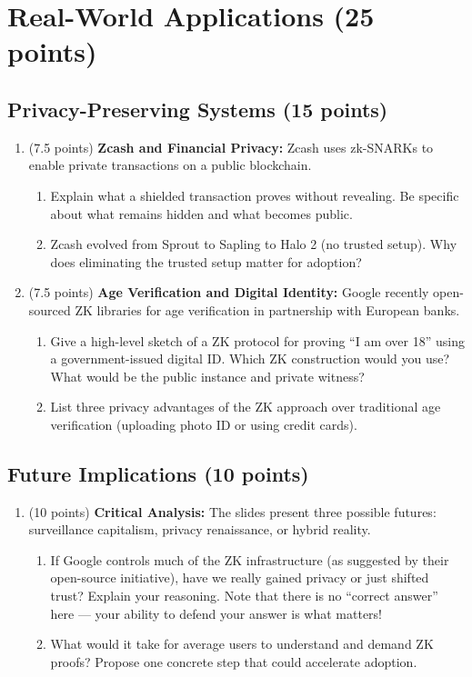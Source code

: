 \documentclass[10pt,a4paper,american]{exam}
\begin{document}
\section{Real-World Applications (25 points)}

\subsection{Privacy-Preserving Systems (15 points)}

\begin{enumerate}
	\item (7.5 points) \textbf{Zcash and Financial Privacy:}
	      Zcash uses zk-SNARKs to enable private transactions on a public blockchain.
	      \begin{enumerate}
		      \item Explain what a shielded transaction proves without revealing. Be specific about what remains hidden and what becomes public.
		      \item Zcash evolved from Sprout to Sapling to Halo 2 (no trusted setup). Why does eliminating the trusted setup matter for adoption?
	      \end{enumerate}
	\item (7.5 points) \textbf{Age Verification and Digital Identity:}
	      Google recently open-sourced ZK libraries for age verification in partnership with European banks.
	      \begin{enumerate}
		      \item Give a high-level sketch of a ZK protocol for proving ``I am over 18'' using a government-issued digital ID. Which ZK construction would you use? What would be the public instance and private witness?
		      \item List three privacy advantages of the ZK approach over traditional age verification (uploading photo ID or using credit cards).
	      \end{enumerate}
\end{enumerate}

\subsection{Future Implications (10 points)}

\begin{enumerate}
	\item (10 points) \textbf{Critical Analysis:}
	      The slides present three possible futures: surveillance capitalism, privacy renaissance, or hybrid reality.
	      \begin{enumerate}
		      \item If Google controls much of the ZK infrastructure (as suggested by their open-source initiative), have we really gained privacy or just shifted trust? Explain your reasoning. Note that there is no ``correct answer'' here — your ability to defend your answer is what matters!
		      \item What would it take for average users to understand and demand ZK proofs? Propose one concrete step that could accelerate adoption.
	      \end{enumerate}
\end{enumerate}
\end{document}
